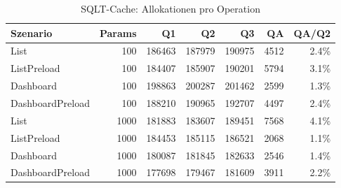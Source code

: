 \begin{table}[ht]
\centering
\caption{SQLT-Cache: Allokationen pro Operation}
\begin{tabular}{lrrrrrr}
\toprule
Szenario & Params & Q1 & Q2 & Q3 & QA & QA/Q2 \\
\midrule
		List & 100 & 186463 & 187979 & 190975 & 4512 & 2.4\% \\
		ListPreload & 100 & 184407 & 185907 & 190201 & 5794 & 3.1\% \\
		Dashboard & 100 & 198863 & 200287 & 201462 & 2599 & 1.3\% \\
		DashboardPreload & 100 & 188210 & 190965 & 192707 & 4497 & 2.4\% \\
		List & 1000 & 181883 & 183607 & 189451 & 7568 & 4.1\% \\
		ListPreload & 1000 & 184453 & 185115 & 186521 & 2068 & 1.1\% \\
		Dashboard & 1000 & 180087 & 181845 & 182633 & 2546 & 1.4\% \\
		DashboardPreload & 1000 & 177698 & 179467 & 181609 & 3911 & 2.2\% \\
\bottomrule
\end{tabular}
\label{tab:benchmark_sqlt-cache_allocsperop}
\end{table}
	